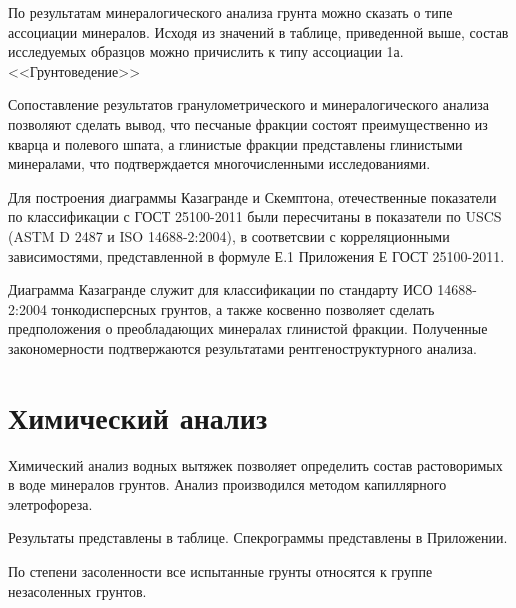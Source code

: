 По результатам минералогического анализа грунта можно сказать о типе ассоциации минералов. Исходя из значений в таблице, приведенной выше, состав исследуемых образцов можно причислить к типу ассоциации 1а.<<Грунтоведение>>


Сопоставление результатов гранулометрического и минералогического анализа позволяют сделать вывод, 
что песчаные фракции состоят преимущественно из кварца и полевого шпата, 
а глинистые фракции представлены глинистыми минералами, что подтверждается многочисленными исследованиями.

Для построения диаграммы Казагранде и Скемптона, отечественные показатели по классификации с ГОСТ 25100-2011 были пересчитаны в показатели по USCS (ASTM D 2487 и ISO 14688-2:2004), 
в соответсвии с корреляционными зависимостями, представленной в формуле Е.1 Приложения Е ГОСТ 25100-2011.

Диаграмма Казагранде служит для классификации по стандарту ИСО 14688-2:2004 тонкодисперсных грунтов, а также косвенно позволяет сделать предположения
о преобладающих минералах глинистой фракции. Полученные закономерности подтвержаются результатами рентгеноструктурного анализа. 



\section{Химический анализ}


Химический анализ водных вытяжек позволяет определить состав растоворимых в воде минералов грунтов.
Анализ производился методом капиллярного элетрофореза. 

Результаты представлены в таблице.
Спекрограммы представлены в Приложении.

По степени засоленности все испытанные грунты относятся к группе незасоленных грунтов.

